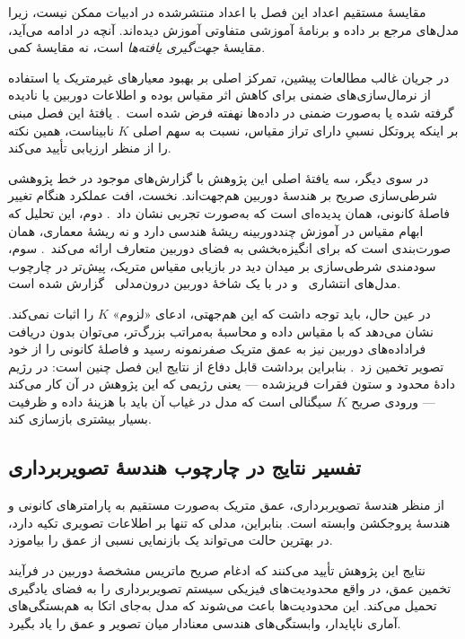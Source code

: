 مقایسهٔ مستقیم اعداد این فصل با اعداد منتشرشده در ادبیات ممکن نیست، زیرا
مدل‌های مرجع بر داده و برنامهٔ آموزشی متفاوتی آموزش دیده‌اند. آنچه در ادامه
می‌آید، مقایسهٔ \emph{جهت‌گیری یافته‌ها} است، نه مقایسهٔ کمی.

در جریان غالب مطالعات پیشین، تمرکز اصلی بر بهبود معیارهای غیرمتریک یا استفاده
از نرمال‌سازی‌های ضمنی برای کاهش اثر مقیاس بوده و اطلاعات دوربین یا نادیده گرفته
شده یا به‌صورت ضمنی در داده‌ها نهفته فرض شده است~\cite{Eigen2014Depth,Godard2019Digging,Ranftl2019Robust,DepthAnythingV2}.
یافتهٔ این فصل مبنی بر اینکه پروتکل نسبیِ دارای تراز مقیاس، نسبت به سهم اصلی
$K$ نابیناست، همین نکته را از منظر ارزیابی تأیید می‌کند.

در سوی دیگر، سه یافتهٔ اصلی این پژوهش با گزارش‌های موجود در خط پژوهشی
شرطی‌سازی صریح بر هندسهٔ دوربین هم‌جهت‌اند. نخست، افت عملکرد هنگام تغییر
فاصلهٔ کانونی، همان پدیده‌ای است که  به‌صورت تجربی نشان
داد~\cite{Facil2019CAMConvs}. دوم، این تحلیل که ابهام مقیاس در آموزش
چنددوربینه ریشهٔ هندسی دارد و نه ریشهٔ معماری، همان صورت‌بندی است که
 برای انگیزه‌بخشی به فضای دوربین متعارف ارائه می‌کند~\cite{Yin2023Metric3D}.
سوم، سودمندی شرطی‌سازی بر میدان دید در بازیابی مقیاس متریک، پیش‌تر در چارچوب
مدل‌های انتشاری~\cite{Saxena2023FOV} و در  با یک شاخهٔ دوربین
درون‌مدلی~\cite{Piccinelli2024UniDepth} گزارش شده است.

در عین حال، باید توجه داشت که این هم‌جهتی، ادعای «لزوم» $K$ را اثبات نمی‌کند.
 نشان می‌دهد که با مقیاس داده و محاسبهٔ به‌مراتب بزرگ‌تر، می‌توان
بدون دریافت فراداده‌های دوربین نیز به عمق متریک صفرنمونه رسید و فاصلهٔ کانونی
را از خود تصویر تخمین زد~\cite{Bochkovskii2025DepthPro}. بنابراین برداشت
قابل دفاع از نتایج این فصل چنین است: در رژیم دادهٔ محدود و ستون فقرات فریزشده ---
یعنی رژیمی که این پژوهش در آن کار می‌کند --- ورودی صریح $K$ سیگنالی است که
مدل در غیاب آن باید با هزینهٔ داده و ظرفیت بسیار بیشتری بازسازی کند.

\subsection{تفسیر نتایج در چارچوب هندسهٔ تصویربرداری}
\label{subsec:geometric_interpretation}

از منظر هندسهٔ تصویربرداری،
عمق متریک به‌صورت مستقیم
به پارامترهای کانونی و هندسهٔ پروجکشن وابسته است.
بنابراین،
مدلی که تنها بر اطلاعات تصویری تکیه دارد،
در بهترین حالت
می‌تواند یک بازنمایی نسبی از عمق را بیاموزد.

نتایج این پژوهش تأیید می‌کنند که
ادغام صریح ماتریس مشخصهٔ دوربین
در فرآیند تخمین عمق،
در واقع محدودیت‌های فیزیکی سیستم تصویربرداری
را به فضای یادگیری تحمیل می‌کند.
این محدودیت‌ها باعث می‌شوند که
مدل به‌جای اتکا به هم‌بستگی‌های آماری ناپایدار،
وابستگی‌های هندسی معنادار
میان تصویر و عمق را یاد بگیرد.


